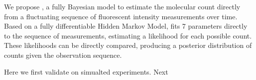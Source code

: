 We propose \ours, a fully Bayesian model to estimate the molecular 
  count directly from a fluctuating sequence of fluorescent intensity measurements over time.
  Based on a fully differentiable Hidden Markov Model, \ours fits 7 parameters
  directly to the sequence of measurements, estimating a likelihood for each possible count. 
  These likelihoods can be directly compared, producing a posterior distribution of counts 
  given the observation sequence. 

Here we first validate \ours on simualted experiments. Next
